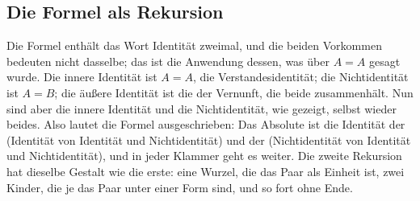 \documentclass[11pt,a4paper]{article}
\begin{document}
\subsection{Die Formel als Rekursion}

Die Formel enthält das Wort Identität zweimal, und die beiden Vorkommen bedeuten nicht dasselbe; das ist die Anwendung dessen, was über $A = A$ gesagt wurde. Die innere Identität ist $A = A$, die Verstandesidentität; die Nichtidentität ist $A = B$; die äußere Identität ist die der Vernunft, die beide zusammenhält. Nun sind aber die innere Identität und die Nichtidentität, wie gezeigt, selbst wieder beides. Also lautet die Formel ausgeschrieben: Das Absolute ist die Identität der (Identität von Identität und Nichtidentität) und der (Nichtidentität von Identität und Nichtidentität), und in jeder Klammer geht es weiter. Die zweite Rekursion hat dieselbe Gestalt wie die erste: eine Wurzel, die das Paar als Einheit ist, zwei Kinder, die je das Paar unter einer Form sind, und so fort ohne Ende.
\end{document}
